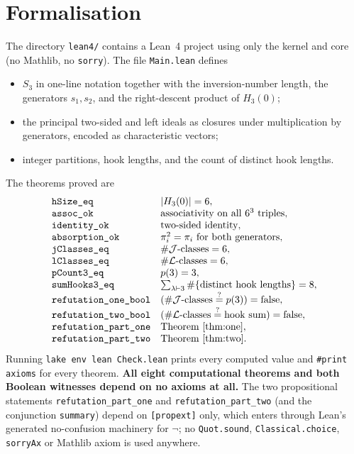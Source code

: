 \documentclass[11pt]{article}
\begin{document}
\section{Formalisation}

The directory \texttt{lean4/} contains a Lean~4 project using only the kernel
and core (no Mathlib, no \texttt{sorry}).  The file \texttt{Main.lean} defines
\begin{itemize}
  \item $S_3$ in one-line notation together with the inversion-number length,
        the generators $s_1, s_2$, and the right-descent product of $H_3(0)$;
  \item the principal two-sided and left ideals as closures under multiplication
        by generators, encoded as characteristic vectors;
  \item integer partitions, hook lengths, and the count of distinct hook lengths.
\end{itemize}
The theorems proved are
\[
\begin{array}{ll}
\texttt{hSize\_eq}              & \lvert H_3(0)\rvert = 6,\\
\texttt{assoc\_ok}              & \text{associativity on all }6^3\text{ triples},\\
\texttt{identity\_ok}           & \text{two-sided identity},\\
\texttt{absorption\_ok}         & \pi_i^2 = \pi_i\text{ for both generators},\\
\texttt{jClasses\_eq}           & \#\mathcal{J}\text{-classes} = 6,\\
\texttt{lClasses\_eq}           & \#\mathcal{L}\text{-classes} = 6,\\
\texttt{pCount3\_eq}            & p(3) = 3,\\
\texttt{sumHooks3\_eq}          & \sum_{\lambda\vdash 3}\#\{\text{distinct hook lengths}\} = 8,\\
\texttt{refutation\_one\_bool}  & (\#\mathcal{J}\text{-classes} \stackrel{?}{=} p(3)) = \mathrm{false},\\
\texttt{refutation\_two\_bool}  & (\#\mathcal{L}\text{-classes} \stackrel{?}{=} \text{hook sum}) = \mathrm{false},\\
\texttt{refutation\_part\_one}  & \text{Theorem~\ref{thm:one}},\\
\texttt{refutation\_part\_two}  & \text{Theorem~\ref{thm:two}}.
\end{array}
\]
Running \texttt{lake env lean Check.lean} prints every computed value and
\texttt{\#print axioms} for every theorem.  \textbf{All eight computational
theorems and both Boolean witnesses depend on no axioms at all.}  The two
propositional statements \texttt{refutation\_part\_one} and
\texttt{refutation\_part\_two} (and the conjunction \texttt{summary}) depend on
\texttt{[propext]} only, which enters through Lean's generated no-confusion
machinery for $\lnot$; no \texttt{Quot.sound}, \texttt{Classical.choice},
\texttt{sorryAx} or Mathlib axiom is used anywhere.
\end{document}
